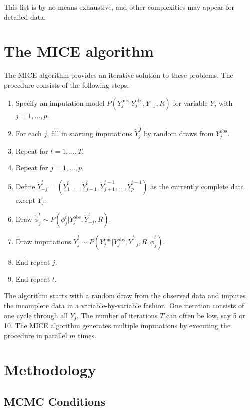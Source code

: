 \documentclass[
]{book}
\providecommand{\tightlist}{%
  \setlength{\itemsep}{0pt}\setlength{\parskip}{0pt}}
\begin{document}
This list is by no means exhaustive, and other complexities may appear
for detailed data.

\hypertarget{sec:MICE}{%
\section{The MICE algorithm}\label{sec:MICE}}

The MICE algorithm provides an iterative solution to these problems. The procedure consists of the following steps:

\begin{enumerate}
\def\labelenumi{\arabic{enumi}.}
\tightlist
\item
  Specify an imputation model \(P(Y_j^\mathrm{mis}|Y_j^\mathrm{obs}, Y_{-j}, R)\) for variable \(Y_j\) with \(j=1,\dots,p\).
\item
  For each \(j\), fill in starting imputations \(\dot Y_j^0\) by random draws from \(Y_j^\mathrm{obs}\).
\item
  Repeat for \(t = 1,\dots,T\).
\item
  Repeat for \(j = 1,\dots,p\).
\item
  Define \(\dot Y_{-j}^t = (\dot Y_1^t,\dots,\dot Y_{j-1}^t,\dot Y_{j+1}^{t-1},\dots,\dot Y_p^{t-1})\) as the currently complete data except \(Y_j\).
\item
  Draw \(\dot\phi_j^t \sim P(\phi_j^t|Y_j^\mathrm{obs}, \dot Y_{-j}^t, R)\).
\item
  Draw imputations \(\dot Y_j^t \sim P(Y_j^\mathrm{mis}|Y_j^\mathrm{obs}, \dot Y_{-j}^t, R, \dot\phi_j^t)\).
\item
  End repeat \(j\).
\item
  End repeat \(t\).
\end{enumerate}

The algorithm starts with a random draw from the observed data and imputes the incomplete data in a variable-by-variable fashion. One iteration consists of one cycle through all \(Y_j\). The number of iterations \(T\) can often be low, say 5 or 10. The MICE algorithm generates multiple imputations by executing the procedure in parallel \(m\) times.

\hypertarget{methodology}{%
\section{Methodology}\label{methodology}}

\hypertarget{mcmc-conditions}{%
\subsection{MCMC Conditions}\label{mcmc-conditions}}
\end{document}

